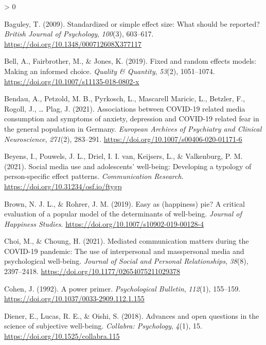 \documentclass[
  english,
  man,mask,floatsintext]{apa6}
\newlength{\cslhangindent}
\newenvironment{CSLReferences}[2] %
 {%
  \setlength{\parindent}{0pt}
  \ifodd #1 \everypar{\setlength{\hangindent}{\cslhangindent}}\ignorespaces\fi
  \ifnum #2 > 0
  \setlength{\parskip}{#2\baselineskip}
  \fi
 }%
 {}
\begin{document}
\hypertarget{refs}{}
\begin{CSLReferences}{1}{0}
\leavevmode\hypertarget{ref-baguleyStandardizedSimpleEffect2009}{}%
Baguley, T. (2009). Standardized or simple effect size: {What} should be reported? \emph{British Journal of Psychology}, \emph{100}(3), 603--617. \url{https://doi.org/10.1348/000712608X377117}

\leavevmode\hypertarget{ref-bellFixedRandomEffects2019}{}%
Bell, A., Fairbrother, M., \& Jones, K. (2019). Fixed and random effects models: Making an informed choice. \emph{Quality \& Quantity}, \emph{53}(2), 1051--1074. \url{https://doi.org/10.1007/s11135-018-0802-x}

\leavevmode\hypertarget{ref-bendauAssociationsCOVID19Related2021}{}%
Bendau, A., Petzold, M. B., Pyrkosch, L., Mascarell Maricic, L., Betzler, F., Rogoll, J., \ldots{} Plag, J. (2021). Associations between {COVID}-19 related media consumption and symptoms of anxiety, depression and {COVID}-19 related fear in the general population in {Germany}. \emph{European Archives of Psychiatry and Clinical Neuroscience}, \emph{271}(2), 283--291. \url{https://doi.org/10.1007/s00406-020-01171-6}

\leavevmode\hypertarget{ref-beyensSocialMediaUse2021}{}%
Beyens, I., Pouwels, J. L., Driel, I. I. van, Keijsers, L., \& Valkenburg, P. M. (2021). Social media use and adolescents' well-being: {Developing} a typology of person-specific effect patterns. \emph{Communication Research}. \url{https://doi.org/10.31234/osf.io/ftygp}

\leavevmode\hypertarget{ref-brownEasyHappinessPie2019}{}%
Brown, N. J. L., \& Rohrer, J. M. (2019). Easy as (happiness) pie? {A} critical evaluation of a popular model of the determinants of well-being. \emph{Journal of Happiness Studies}. \url{https://doi.org/10.1007/s10902-019-00128-4}

\leavevmode\hypertarget{ref-choiMediatedCommunicationMatters2021}{}%
Choi, M., \& Choung, H. (2021). Mediated communication matters during the {COVID}-19 pandemic: {The} use of interpersonal and masspersonal media and psychological well-being. \emph{Journal of Social and Personal Relationships}, \emph{38}(8), 2397--2418. \url{https://doi.org/10.1177/02654075211029378}

\leavevmode\hypertarget{ref-cohenPowerPrimer1992}{}%
Cohen, J. (1992). A power primer. \emph{Psychological Bulletin}, \emph{112}(1), 155--159. \url{https://doi.org/10.1037/0033-2909.112.1.155}

\leavevmode\hypertarget{ref-dienerAdvancesOpenQuestions2018}{}%
Diener, E., Lucas, R. E., \& Oishi, S. (2018). Advances and open questions in the science of subjective well-being. \emph{Collabra: Psychology}, \emph{4}(1), 15. \url{https://doi.org/10.1525/collabra.115}


\end{CSLReferences}
\end{document}
